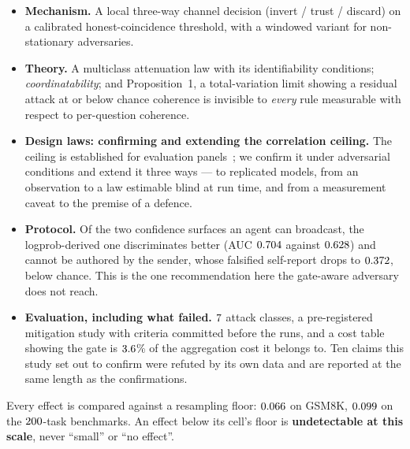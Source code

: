 \begin{itemize}
\item \textbf{Mechanism.} A local three-way channel decision (invert / trust /
      discard) on a calibrated honest-coincidence threshold, with a windowed
      variant for non-stationary adversaries.
\item \textbf{Theory.} A multiclass attenuation law with its identifiability
      conditions; \emph{coordinatability}; and Proposition~1, a total-variation
      limit showing a residual attack at or below chance coherence is invisible
      to \emph{every} rule measurable with respect to per-question coherence.
\item \textbf{Design laws: confirming and extending the correlation ceiling.}
      The ceiling is established for evaluation
      panels~\cite{judgecorr,panelcorr,hivemind}; we confirm it under adversarial
      conditions and extend it three ways --- to replicated models, from an
      observation to a law estimable blind at run time, and from a measurement
      caveat to the premise of a defence.
\item \textbf{Protocol.} Of the two confidence surfaces an agent can broadcast,
      the logprob-derived one discriminates better (AUC $0.704$ against
      $0.628$) and cannot be authored by the sender, whose falsified
      self-report drops to $0.372$, below chance. This is
      the one recommendation here the gate-aware adversary does not reach.
\item \textbf{Evaluation, including what failed.} $7$ attack
      classes, a pre-registered mitigation study with criteria committed before
      the runs, and a cost table showing the gate is
      $3.6$\% of the aggregation cost it belongs to. Ten
      claims this study set out to confirm were refuted by its own data and are
      reported at the same length as the confirmations.
\end{itemize}

Every effect is compared against a resampling floor: $0.066$ on GSM8K,
$0.099$ on the $200$-task benchmarks. An effect below its
cell's floor is \textbf{undetectable at this scale}, never ``small'' or ``no
effect''.
